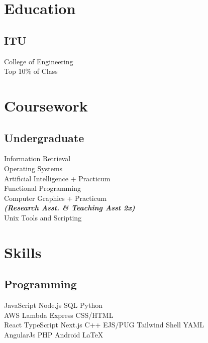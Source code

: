 \documentclass[]{deedy-resume-openfont}
\begin{document}
\begin{minipage}[t]{0.33\textwidth} 


\section{Education} 
\subsection{ITU}
College of Engineering \\
Top 10\% of Class \\
\sectionsep


\section{Coursework}
\subsection{Undergraduate}
Information Retrieval \\
Operating Systems \\
Artificial Intelligence + Practicum \\
Functional Programming \\
Computer Graphics + Practicum \\
{\footnotesize \textit{\textbf{(Research Asst. \& Teaching Asst 2x) }}} \\
Unix Tools and Scripting \\
\sectionsep


\section{Skills}
\subsection{Programming}
JavaScript \textbullet{} Node.js \textbullet{} SQL \textbullet{} Python \\
AWS Lambda \textbullet{} Express \textbullet{} CSS/HTML \\
\vspace{5pt}
React \textbullet{} TypeScript \textbullet{} Next.js \textbullet{} C++ \textbullet{} EJS/PUG \textbullet{} Tailwind \textbullet{} Shell \textbullet{} YAML\\
\vspace{5pt}
AngularJs \textbullet{} PHP \textbullet{} Android \textbullet{} \LaTeX\
\sectionsep


\end{minipage}
\end{document}
